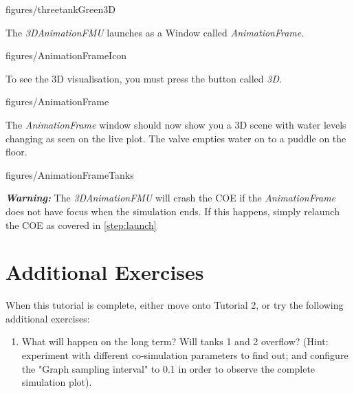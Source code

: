 \documentclass[11pt,a4paper]{../tutorial}
\begin{document}
\begin{instructions}
    \begin{annotation}[width=0.85\linewidth,trim=0 140 0 110,clip]{figures/threetankGreen3D}
    \end{annotation}

\item  The \emph{3DAnimationFMU} launches as a Window called \emph{AnimationFrame}.

    \begin{annotation}[scale=0.6]{figures/AnimationFrameIcon}
    \end{annotation}

    To see the 3D visualisation, you must press the button called \emph{3D}.

    \begin{annotation}[width=0.5\linewidth]{figures/AnimationFrame}
    \end{annotation}

\newpage
\item The \emph{AnimationFrame} window should now show you a 3D scene with water levels changing as seen on the live plot. The valve empties water on to a puddle on the floor.

    \begin{annotation}[width=0.5\linewidth]{figures/AnimationFrameTanks}
    \end{annotation}

    \textbf{\emph{Warning:}} The \emph{3DAnimationFMU} will crash the COE if the \emph{AnimationFrame} does not have focus when the simulation ends. If this happens, simply relaunch the COE as covered in \ref{step:launch}


\end{instructions}

\section{Additional Exercises}

When this tutorial is complete, either move onto Tutorial 2, or try the following additional exercises:

\begin{enumerate}
	\item What will happen on the long term? Will tanks 1 and 2 overflow? (Hint: experiment with different co-simulation parameters to find out; and configure the "Graph sampling interval" to 0.1 in order to observe the complete simulation plot).
\end{enumerate}
\end{document}
